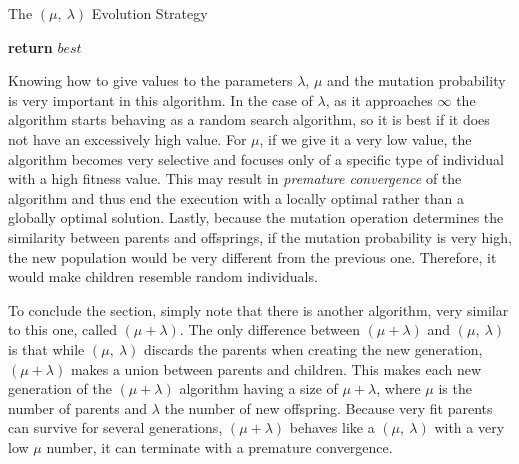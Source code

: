 \begin{algorithm}[H]
    \caption{The $(\mu,\ \lambda)$ Evolution Strategy}
    \begin{algorithmic}[1]
            \EndFor
                    \EndIf
                \EndFor
                    \EndFor
                \EndFor
            \EndWhile
            \State \textbf{return} $best$
        \EndProcedure
    \end{algorithmic}
\end{algorithm}

Knowing how to give values to the parameters $\lambda$, $\mu$ and the mutation probability is very important in this algorithm. In the case of $\lambda$, as it approaches $\infty$ the algorithm starts behaving as a random search algorithm, so it is best if it does not have an excessively high value. For $\mu$, if we give it a very low value, the algorithm becomes very selective and focuses only of a specific type of individual with a high fitness value. This may result in \textit{premature convergence} of the algorithm and thus end the execution with a locally optimal rather than a globally optimal solution. Lastly, because the mutation operation determines the similarity between parents and offsprings, if the mutation probability is very high, the new population would be very different from the previous one. Therefore, it would make children resemble random individuals.

To conclude the section, simply note that there is another algorithm, very similar to this one, called $(\mu + \lambda)$. The only difference between $(\mu + \lambda)$ and $(\mu,\ \lambda)$ is that while $(\mu,\ \lambda)$ discards the parents when creating the new generation, $(\mu + \lambda)$ makes a union between parents and children. This makes each new generation of the $(\mu + \lambda)$ algorithm having a size of $\mu + \lambda$, where $\mu$ is the number of parents and $\lambda$ the number of new offspring. Because very fit parents can survive for several generations, $(\mu + \lambda)$ behaves like a $(\mu,\ \lambda)$ with a very low $\mu$ number, it can terminate with a premature convergence.


